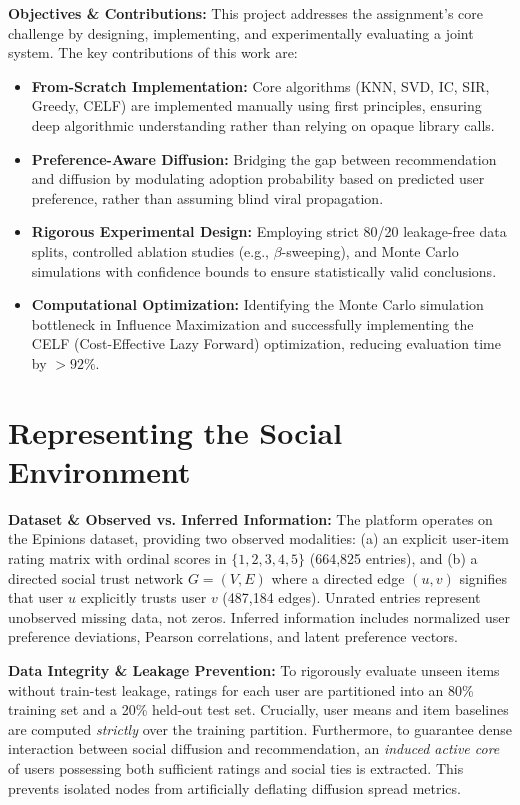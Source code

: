 \documentclass[conference]{IEEEtran}
\begin{document}
\textbf{Objectives \& Contributions:} This project addresses the assignment's core challenge by designing, implementing, and experimentally evaluating a joint system. The key contributions of this work are:
\begin{itemize}[leftmargin=*]
    \item \textbf{From-Scratch Implementation:} Core algorithms (KNN, SVD, IC, SIR, Greedy, CELF) are implemented manually using first principles, ensuring deep algorithmic understanding rather than relying on opaque library calls.
    \item \textbf{Preference-Aware Diffusion:} Bridging the gap between recommendation and diffusion by modulating adoption probability based on predicted user preference, rather than assuming blind viral propagation.
    \item \textbf{Rigorous Experimental Design:} Employing strict 80/20 leakage-free data splits, controlled ablation studies (e.g., $\beta$-sweeping), and Monte Carlo simulations with confidence bounds to ensure statistically valid conclusions.
    \item \textbf{Computational Optimization:} Identifying the Monte Carlo simulation bottleneck in Influence Maximization and successfully implementing the CELF (Cost-Effective Lazy Forward) optimization, reducing evaluation time by $>92\%$.
\end{itemize}

\section{Representing the Social Environment}
\textbf{Dataset \& Observed vs. Inferred Information:} The platform operates on the Epinions dataset, providing two observed modalities: (a) an explicit user-item rating matrix with ordinal scores in $\{1, 2, 3, 4, 5\}$ (664,825 entries), and (b) a directed social trust network $G=(V, E)$ where a directed edge $(u, v)$ signifies that user $u$ explicitly trusts user $v$ (487,184 edges). Unrated entries represent unobserved missing data, not zeros. Inferred information includes normalized user preference deviations, Pearson correlations, and latent preference vectors.

\textbf{Data Integrity \& Leakage Prevention:} To rigorously evaluate unseen items without train-test leakage, ratings for each user are partitioned into an 80\% training set and a 20\% held-out test set. Crucially, user means and item baselines are computed \textit{strictly} over the training partition. Furthermore, to guarantee dense interaction between social diffusion and recommendation, an \textit{induced active core} of users possessing both sufficient ratings and social ties is extracted. This prevents isolated nodes from artificially deflating diffusion spread metrics.
\end{document}
